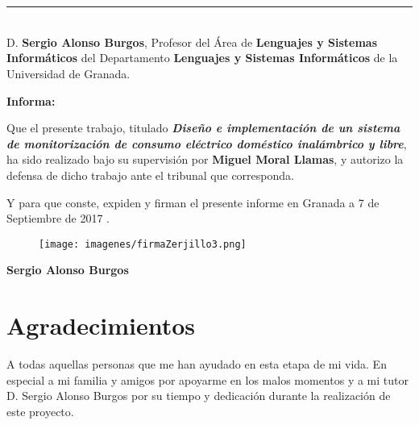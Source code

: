 \chapter*{}
\thispagestyle{empty}

\noindent\rule[-1ex]{\textwidth}{2pt}\\[4.5ex]

D. \textbf{Sergio Alonso Burgos}, Profesor del Área de \textbf{Lenguajes y Sistemas Informáticos} del Departamento \textbf{Lenguajes y Sistemas Informáticos} de la Universidad de Granada.


\vspace{0.5cm}

\textbf{Informa:}

\vspace{0.5cm}

Que el presente trabajo, titulado \textit{\textbf{Diseño e implementación de un sistema de monitorización de consumo eléctrico doméstico inalámbrico y libre}},
ha sido realizado bajo su supervisión por \textbf{Miguel Moral Llamas}, y autorizo la defensa de dicho trabajo ante el tribunal
que corresponda.

\vspace{0.5cm}

Y para que conste, expiden y firman el presente informe en Granada a 7 de Septiembre de 2017 .

\vspace{1cm}

\begin{figure}[H]
	\centering
	\texttt{[image: imagenes/firmaZerjillo3.png]}
	\label{fig:firmatutor}
\end{figure}


\vspace{1cm}

\noindent \textbf{Sergio Alonso Burgos}

\chapter*{Agradecimientos}
\thispagestyle{empty}

       \vspace{1cm}


A todas aquellas personas que me han ayudado en esta etapa de mi vida. En especial a mi familia y amigos por apoyarme en los malos momentos y a mi tutor D. Sergio Alonso Burgos por su tiempo y dedicación durante la realización de este proyecto.

